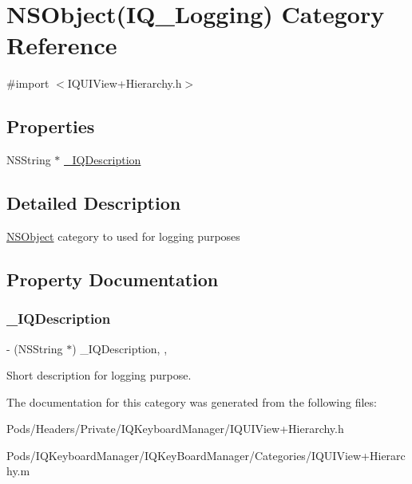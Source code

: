 \hypertarget{category_n_s_object_07_i_q___logging_08}{}\section{N\+S\+Object(I\+Q\+\_\+\+Logging) Category Reference}
\label{category_n_s_object_07_i_q___logging_08}


{\ttfamily \#import $<$I\+Q\+U\+I\+View+\+Hierarchy.\+h$>$}

\subsection*{Properties}
\begin{DoxyCompactItemize}
\item 
N\+S\+String $\ast$ \mbox{\hyperlink{category_n_s_object_07_i_q___logging_08_a04229b3ed963a495775380f854a00153}{\+\_\+\+I\+Q\+Description}}
\end{DoxyCompactItemize}


\subsection{Detailed Description}
\mbox{\hyperlink{class_n_s_object-p}{N\+S\+Object}} category to used for logging purposes 

\subsection{Property Documentation}
\mbox{\label{category_n_s_object_07_i_q___logging_08_a04229b3ed963a495775380f854a00153}} 
\subsubsection{\texorpdfstring{\+\_\+\+I\+Q\+Description}{\_IQDescription}}
{\footnotesize\ttfamily -\/ (N\+S\+String $\ast$) \+\_\+\+I\+Q\+Description\hspace{0.3cm}{\ttfamily [read]}, {\ttfamily [nonatomic]}, {\ttfamily [copy]}}

Short description for logging purpose. 

The documentation for this category was generated from the following files\+:\begin{DoxyCompactItemize}
\item 
Pods/\+Headers/\+Private/\+I\+Q\+Keyboard\+Manager/I\+Q\+U\+I\+View+\+Hierarchy.\+h\item 
Pods/\+I\+Q\+Keyboard\+Manager/\+I\+Q\+Key\+Board\+Manager/\+Categories/I\+Q\+U\+I\+View+\+Hierarchy.\+m\end{DoxyCompactItemize}
